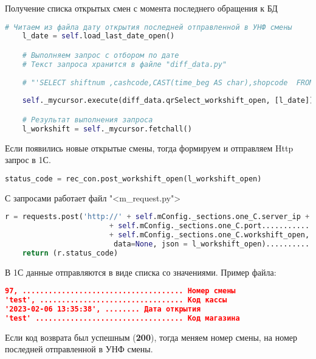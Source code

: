 \begin{itemize}
\newpage
Получение списка открытых смен с момента последнего обращения к БД
\newline
	\begin{lstlisting}[language=Python, caption=Смены из БД]
	# Читаем из файла дату открытия последней отправленной в УНФ смены
	l_date = self.load_last_date_open()

	# Выполняем запрос с отбором по дате
	# Текст запроса хранится в файле "diff_data.py"
	
	# "'SELECT shiftnum ,cashcode,CAST(time_beg AS char),shopcode  FROM workshift WHERE time_end IS NULL AND time_beg >%s  '"
	
	self._mycursor.execute(diff_data.qrSelect_workshift_open, [l_date])

	# Результат выполнения запроса
	l_workshift = self._mycursor.fetchall()
		\end{lstlisting}


 Если появились новые открытые смены, тогда формируем и отправляем Http запрос в 1С. 
\newline
\begin{lstlisting}[language=Python, caption=Http-запрос]
	status_code = rec_con.post_workshift_open(l_workshift_open)
\end{lstlisting}
С запросами работает файл "<m\_request.py"> 
\newline
\begin{lstlisting}[language=Python, caption=Текст Http-запроса]
	r = requests.post('http://' + self.mConfig._sections.one_C.server_ip + ':'..... IP адрес 
						+ self.mConfig._sections.one_C.port........................................Port
						+ self.mConfig._sections.one_C.workshift_open,.................... Процедура
						 data=None, json = l_workshift_open)................................... Данные смен ККМ
	return (r.status_code)
\end{lstlisting} 
 
В 1С данные отправляются в виде списка со значениями. Пример файла:

\begin{lstlisting}[language=json,firstnumber=1, caption= Формат файла открытых смен]
97, ..................................... Номер смены
'test', ................................. Код кассы
'2023-02-06 13:35:38', ........ Дата открытия
'test' .................................. Код магазина
\end{lstlisting}
 
\newpage 
 
Если код возврата был успешным (\textbf{200}), тогда меняем номер смены, на номер последней отправленной в УНФ смены.
\newline


\end{itemize}
